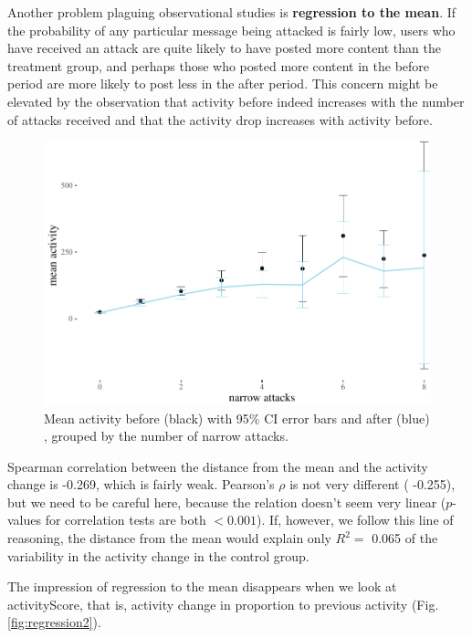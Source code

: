 \documentclass[a4paper,fleqn]{cas-dc}
\begin{document}
Another problem plaguing observational studies is
\textbf{regression to the mean}. If the probability of any particular
message being attacked is fairly low, users who have received an attack
are quite likely to have posted more content than the treatment group,
and perhaps those who posted more content in the \textsf{before} period
are more likely to post less in the \textsf{after} period. This concern
might be elevated by the observation that activity before indeed
increases with the number of attacks received and that the activity drop
increases with \textsf{activity} before.

\begin{figure}
\begin{center}\includegraphics[width=1\linewidth]{images/unnamed-chunk-59-1} \end{center}
\caption{Mean activity before (black) with 95\% CI error bars and after (blue) , grouped by the number of narrow attacks.}
\end{figure}

Spearman correlation between the distance from the mean and the activity
change is -0.269, which is fairly weak. Pearson's \(\rho\) is not very
different ( -0.255), but we need to be careful here, because the
relation doesn't seem very linear (\(p\)-values for correlation tests
are both \(<0.001\)). If, however, we follow this line of reasoning, the
distance from the mean would explain only \(R^2 =\) 0.065 of the
variability in the activity change in the control group.

The impression of regression to the mean disappears when we look at
\textsf{activityScore}, that is, activity change in proportion to
previous activity (Fig. \ref{fig:regression2}).
\end{document}

